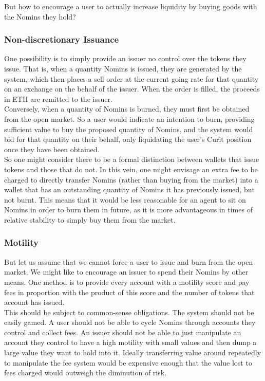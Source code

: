 \noindent But how to encourage a user to actually increase liquidity by buying goods with the Nomins they hold?

\subsubsection{Non-discretionary Issuance}

One possibility is to simply provide an issuer no control over the tokens they issue. That is, when a quantity Nomins is issued, they are generated by the system, which then places a sell order at the current going rate for that quantity on an exchange on the behalf of the issuer. When the order is filled, the proceeds in ETH are remitted to the issuer. \\

\noindent Conversely, when a quantity of Nomins is burned, they must first be obtained from the open market. So a user would indicate an intention to burn, providing sufficient value to buy the proposed quantity of Nomins, and the system would bid for that quantity on their behalf, only liquidating the user's Curit position once they have been obtained. \\

\noindent So one might consider there to be a formal distinction between wallets that issue tokens and those that do not. In this vein, one might envisage an extra fee to be charged to directly transfer Nomins (rather than buying from the market) into a wallet that has an outstanding quantity of Nomins it has previously issued, but not burnt. This means that it would be less reasonable for an agent to sit on Nomins in order to burn them in future, as it is more advantageous in times of relative stability to simply buy them from the market. \\

\subsubsection{Motility}

\noindent But let us assume that we cannot force a user to issue and burn from the open market. We might like to encourage an issuer to spend their Nomins by other means. One method is to provide every account with a motility score and pay fees in proportion with the product of this score and the number of tokens that account has issued. \\

\noindent This should be subject to common-sense obligations. The system should not be easily gamed. A user should not be able to cycle Nomins through accounts they control and collect fees. An issuer should not be able to just manipulate an account they control to have a high motility with small values and then dump a large value they want to hold into it. Ideally transferring value around repeatedly to manipulate the fee system would be expensive enough that the value lost to fees charged would outweigh the diminution of risk. \\

